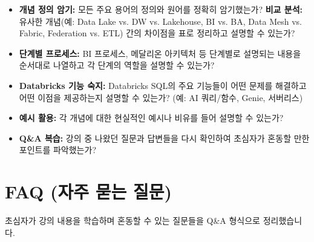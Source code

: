 \documentclass[11pt,a4paper]{article}
\theoremstyle{definition}
\begin{document}
\begin{summarybox}[title=시험 대비 전략 체크리스트]
\begin{itemize}
    \item \textbf{개념 정의 암기:} 모든 주요 용어의 정의와 원어를 정확히 암기했는가?
    \textbf{비교 분석:} 유사한 개념(예: Data Lake vs. DW vs. Lakehouse, BI vs. BA, Data Mesh vs. Fabric, Federation vs. ETL) 간의 차이점을 표로 정리하고 설명할 수 있는가?
    \item \textbf{단계별 프로세스:} BI 프로세스, 메달리온 아키텍처 등 단계별로 설명되는 내용을 순서대로 나열하고 각 단계의 역할을 설명할 수 있는가?
    \item \textbf{Databricks 기능 숙지:} Databricks SQL의 주요 기능들이 어떤 문제를 해결하고 어떤 이점을 제공하는지 설명할 수 있는가? (예: AI 쿼리/함수, Genie, 서버리스)
    \item \textbf{예시 활용:} 각 개념에 대한 현실적인 예시나 비유를 들어 설명할 수 있는가?
    \item \textbf{Q\&A 복습:} 강의 중 나왔던 질문과 답변들을 다시 확인하여 초심자가 혼동할 만한 포인트를 파악했는가?
\end{itemize}
\end{summarybox}

\newpage
\section{FAQ (자주 묻는 질문)}

초심자가 강의 내용을 학습하며 혼동할 수 있는 질문들을 Q\&A 형식으로 정리했습니다.
\end{document}
